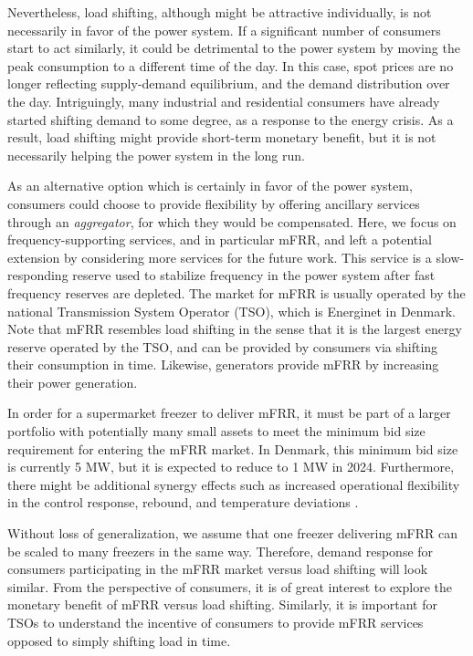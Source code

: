 \documentclass[11pt,a4paper]{article}
\begin{document}
Nevertheless, load shifting, although might be attractive individually, is not necessarily in  favor of the power system.
If a significant number of consumers start to act similarly, it could be detrimental to the power system by moving the peak consumption to a different time of the day. In this case, spot prices are no longer reflecting supply-demand equilibrium, and the demand distribution over the day.
Intriguingly, many industrial and residential consumers have already started shifting demand to some degree, as a response to the energy crisis.
As a result, load shifting might provide short-term monetary benefit, but it is not necessarily helping the power system in the long run.

As an alternative option which is certainly in favor of the power system, consumers could choose to provide flexibility by offering ancillary services through an \textit{aggregator}, for which they would be compensated. Here, we focus on frequency-supporting services, and in particular mFRR, and left a potential extension by considering more services for the future work. This service is a slow-responding reserve used to stabilize frequency in the power system after fast frequency reserves are depleted. The market for mFRR is usually operated by the national Transmission System Operator (TSO), which is Energinet in Denmark. Note that mFRR resembles load shifting in the sense that it is the largest energy reserve operated by the TSO, and can be provided by consumers via shifting their consumption in time. Likewise, generators provide mFRR by increasing their power generation.

In order for a supermarket freezer to deliver mFRR, it must be part of a larger portfolio with potentially many small assets to meet the minimum bid size requirement for entering the mFRR market. In Denmark, this minimum bid size is currently 5 MW, but it is expected to reduce to 1 MW in 2024. Furthermore, there might be additional synergy effects such as increased operational flexibility in the control response, rebound, and temperature deviations \cite{koch2011modeling}.

Without loss of generalization, we assume that one freezer delivering mFRR can be scaled to many freezers in the same way. Therefore,
demand response for consumers participating in the mFRR market versus load shifting will  look similar. From the perspective of consumers, it is of great interest to explore the monetary benefit of mFRR versus load shifting. Similarly, it is important for TSOs to understand the incentive of consumers to provide mFRR services opposed to simply shifting load in time.
\end{document}
